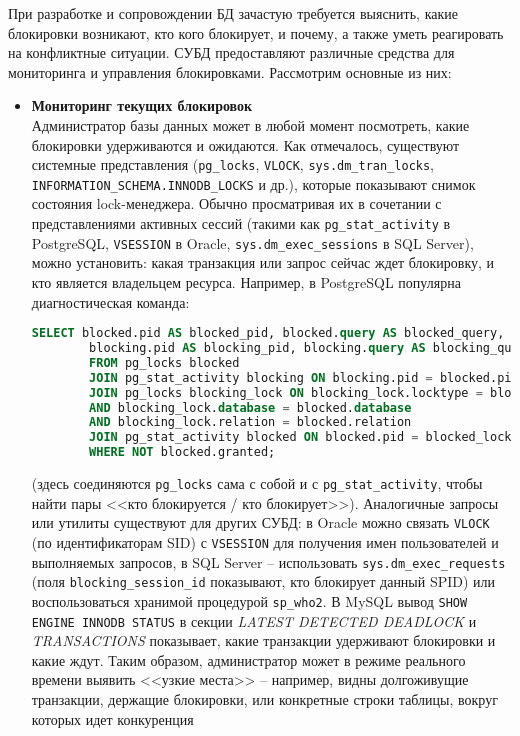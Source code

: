  При разработке и сопровождении БД зачастую требуется выяснить, какие блокировки возникают, кто кого блокирует, и почему, а также уметь реагировать на конфликтные ситуации. СУБД предоставляют различные средства для мониторинга и управления блокировками. Рассмотрим основные из них: 
 \begin{itemize}
    \item \textbf{Мониторинг текущих блокировок} ~\\
    Администратор базы данных может в любой момент посмотреть, какие блокировки удерживаются и ожидаются. Как отмечалось, существуют системные представления (\texttt{pg\_locks}, \texttt{V\textdollar LOCK}, \texttt{sys.dm\_tran\_locks}, \texttt{INFORMATION\_SCHEMA.INNODB\_LOCKS} и др.), которые показывают снимок состояния lock-менеджера. Обычно просматривая их в сочетании с представлениями активных сессий (такими как \texttt{pg\_stat\_activity} в PostgreSQL, \texttt{V\textdollar SESSION} в Oracle, \texttt{sys.dm\_exec\_sessions} в SQL Server), можно установить: какая транзакция или запрос сейчас ждет блокировку, и кто является владельцем ресурса. Например, в PostgreSQL популярна диагностическая команда:
    \begin{lstlisting}[language=SQL]
        SELECT blocked.pid AS blocked_pid, blocked.query AS blocked_query,
        blocking.pid AS blocking_pid, blocking.query AS blocking_query
        FROM pg_locks blocked
        JOIN pg_stat_activity blocking ON blocking.pid = blocked.pid
        JOIN pg_locks blocking_lock ON blocking_lock.locktype = blocked.locktype
        AND blocking_lock.database = blocked.database
        AND blocking_lock.relation = blocked.relation
        JOIN pg_stat_activity blocked ON blocked.pid = blocked_lock.pid
        WHERE NOT blocked.granted;
    \end{lstlisting}

    (здесь соединяются \texttt{pg\_locks} сама с собой и с \texttt{pg\_stat\_activity}, чтобы найти пары <<кто блокируется / кто блокирует>>). Аналогичные запросы или утилиты существуют для других СУБД: в Oracle можно связать \texttt{V\textdollar LOCK} (по идентификаторам SID) с \texttt{V\textdollar SESSION} для получения имен пользователей и выполняемых запросов, в SQL Server – использовать \texttt{sys.dm\_exec\_requests} (поля \texttt{blocking\_session\_id} показывают, кто блокирует данный SPID) или воспользоваться хранимой процедурой \texttt{sp\_who2}. В MySQL вывод \texttt{SHOW ENGINE INNODB STATUS} в секции \textit{LATEST DETECTED DEADLOCK} и \textit{TRANSACTIONS} показывает, какие транзакции удерживают блокировки и какие ждут. Таким образом, администратор может в режиме реального времени выявить <<узкие места>> – например, видны долгоживущие транзакции, держащие блокировки, или конкретные строки таблицы, вокруг которых идет конкуренция
    

\end{itemize}
